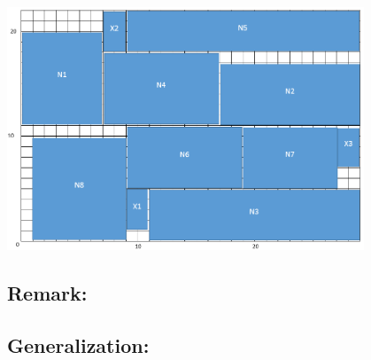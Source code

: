 \documentclass[11pt]{article}
\begin{document}
\begin{center}
\includegraphics[width=0.8\textwidth]{Part1_2_3.png}
\end{center}

\subsection*{Remark:}

\subsection*{Generalization:}




\end{document}
